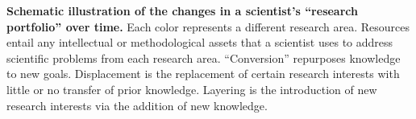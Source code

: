 \documentclass{article}
\begin{document}
\textbf{Schematic illustration of the changes in a scientist's ``research portfolio'' over time.} Each color represents a different research area. Resources entail any intellectual or methodological assets that a scientist uses to address scientific problems from each research area. ``Conversion'' repurposes knowledge to new goals. Displacement is the replacement of certain research interests with little or no transfer of prior knowledge. Layering is the introduction of new research interests via the addition of new knowledge.

\begin{figure}[h]
    \centering
\end{figure}
\end{document}
